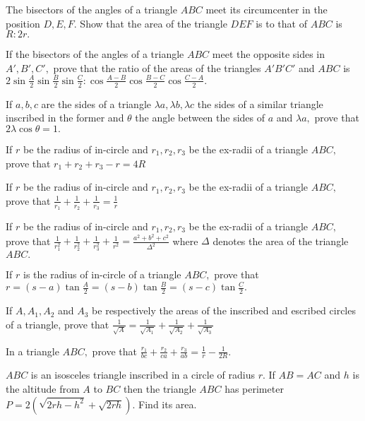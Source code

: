 \item The bisectors of the angles of a triangle $ABC$ meet its circumcenter in the position $D, E, F.$ Show that the area
   of the triangle $DEF$ is to that of $ABC$ is $R:2r.$

\item If the bisectors of the angles of a triangle $ABC$ meet the opposite sides in $A', B', C',$ prove that the ratio of
   the areas of the triangles $A'B'C'$ and $ABC$ is $2\sin\frac{A}{2}\sin\frac{B}{2}\sin\frac{C}{2}:\cos\frac{A -
   B}{2}\cos\frac{B - C}{2}\cos\frac{C - A}{2}.$

\item If $a, b, c$ are the sides of a triangle $\lambda a, \lambda b, \lambda c$ the sides of a similar triangle inscribed
   in the former and $\theta$ the angle between the sides of $a$ and $\lambda a,$ prove that
   $2\lambda\cos\theta = 1.$

\item If $r$ be the radius of in-circle and $r_1, r_2, r_3$ be the ex-radii of a triangle $ABC,$ prove that
   $r_1 + r_2 + r_3 - r = 4R$

\item If $r$ be the radius of in-circle and $r_1, r_2, r_3$ be the ex-radii of a triangle $ABC,$ prove that
   $\frac{1}{r_1} + \frac{1}{r_2} + \frac{1}{r_3} = \frac{1}{r}$

\item If $r$ be the radius of in-circle and $r_1, r_2, r_3$ be the ex-radii of a triangle $ABC,$ prove that
   $\frac{1}{r_1^2} + \frac{1}{r_2^2} + \frac{1}{r_3^2} + \frac{1}{r^2} = \frac{a^2 + b^2 + c^2}{\Delta^2}$ where
   $\Delta$ denotes the area of the triangle $ABC.$

\item If $r$ is the radius of in-circle of a triangle $ABC,$ prove that $r = (s - a)\tan\frac{A}{2} = (s -
   b)\tan\frac{B}{2} = (s - c)\tan\frac{C}{2}.$

\item If $A, A_1, A_2$ and $A_3$ be respectively the areas of the inscribed and escribed circles of a triangle, prove that
   $\frac{1}{\sqrt{A}} = \frac{1}{\sqrt{A_1}} + \frac{1}{\sqrt{A_2}} + \frac{1}{\sqrt{A_3}}$

\item In a triangle $ABC,$ prove that $\frac{r_1}{bc} + \frac{r_2}{ca} + \frac{r_3}{ab} = \frac{1}{r} - \frac{1}{2R}.$

\item $ABC$ is an isosceles triangle inscribed in a circle of radius $r.$ If $AB = AC$ and $h$ is the altitude
   from $A$ to $BC$ then the triangle $ABC$ has perimeter $P = 2(\sqrt{2rh - h^2} + \sqrt{2rh}).$ Find its
   area.

